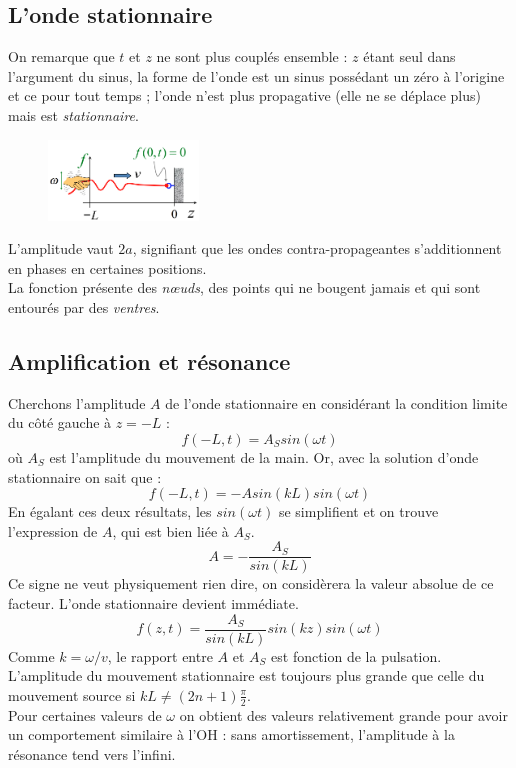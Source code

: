 \documentclass	[11pt, a4paper, openany]{book}
\begin{document}
		\subsection{L'onde stationnaire}
		On remarque que $t$ et $z$ ne sont plus couplés ensemble : $z$ étant seul dans l'argument du sinus, la forme de l'onde est un sinus possédant un zéro à l'origine et ce pour tout temps ; l'onde n'est plus propagative (elle ne se déplace plus) mais est \textit{stationnaire}.\\
		
		\begin{figure}
			\includegraphics[width=4cm]{oo/image37.png}
		\end{figure}
		L'amplitude vaut $2a$, signifiant que les ondes contra-propageantes s'additionnent en phases en certaines positions.\\
		La fonction présente des \textit{nœuds}, des points qui ne bougent jamais et qui sont entourés par des \textit{ventres}.
		
		\subsection{Amplification et résonance}
		Cherchons l'amplitude $A$ de l'onde stationnaire en considérant la condition limite du côté gauche à $z = -L$ : 
		\begin{equation}
			f(-L, t) = A_S sin(\omega t)
		\end{equation}
		où $A_S$ est l'amplitude du mouvement de la main. Or, avec la solution d'onde stationnaire on sait que : 
		\begin{equation}
			f(-L, t) = -A sin(kL)sin(\omega t)
		\end{equation}
		En égalant ces deux résultats, les $sin(\omega t)$ se simplifient et on trouve l'expression de $A$, qui est bien liée à $A_S$.
		\begin{equation}
			A = -\frac{A_S}{sin(kL)}
		\end{equation}
		Ce signe ne veut physiquement rien dire, on considèrera la valeur absolue de ce facteur. L'onde stationnaire devient immédiate.
		\begin{equation}
			f(z, t) = \frac{A_S}{sin(kL)}sin(kz)sin(\omega t)
		\end{equation}
		Comme $k = \omega / v$, le rapport entre $A$ et $A_S$ est fonction de la pulsation. L'amplitude du mouvement stationnaire est toujours plus grande que celle du mouvement source si $kL \neq (2n + 1)\frac{\pi}{2}$.\\
		Pour certaines valeurs de $\omega$ on obtient des valeurs relativement grande pour avoir un comportement similaire à l'OH : sans amortissement, l'amplitude à la résonance tend vers l'infini.
		
\end{document}
